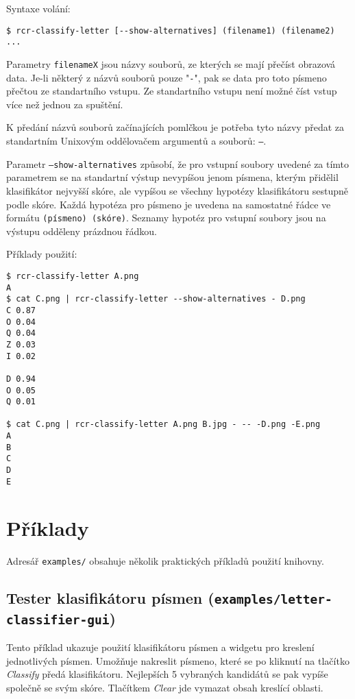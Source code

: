 \documentclass[a4paper]{article}
\begin{document}
Syntaxe volání:
\begin{lstlisting}
$ rcr-classify-letter [--show-alternatives] (filename1) (filename2) ...
\end{lstlisting}

Parametry \texttt{filenameX} jsou názvy souborů, ze kterých se mají přečíst
obrazová data. Je-li některý z názvů souborů pouze "\texttt{-}", pak se data
pro toto písmeno přečtou ze standartního vstupu. Ze standartního vstupu
není možné číst vstup více než jednou za spuštění.

K předání názvů souborů začínajících pomlčkou je potřeba tyto názvy předat
za standartním Unixovým oddělovačem argumentů a souborů: \texttt{--}.

Parametr \texttt{--show-alternatives} způsobí, že pro vstupní soubory
uvedené za tímto parametrem se na standartní výstup nevypíšou jenom
písmena, kterým přidělil klasifikátor nejvyšší skóre, ale vypíšou se
všechny hypotézy klasifikátoru sestupně podle skóre. Každá hypotéza
pro písmeno je uvedena na samostatné řádce ve formátu \texttt{(písmeno)
(skóre)}. Seznamy hypotéz pro vstupní soubory jsou na výstupu odděleny prázdnou
řádkou.

Příklady použití:
\begin{lstlisting}
$ rcr-classify-letter A.png
A
$ cat C.png | rcr-classify-letter --show-alternatives - D.png
C 0.87
O 0.04
Q 0.04
Z 0.03
I 0.02

D 0.94
O 0.05
Q 0.01

$ cat C.png | rcr-classify-letter A.png B.jpg - -- -D.png -E.png
A
B
C
D
E
\end{lstlisting}

\section{Příklady}
Adresář \texttt{examples/} obsahuje několik praktických příkladů použití knihovny.

\subsection{Tester klasifikátoru písmen (\texttt{examples/letter-classifier-gui})}
Tento příklad ukazuje použití klasifikátoru písmen a widgetu pro kreslení
jednotlivých písmen. Umožňuje nakreslit písmeno, které se po kliknutí na
tlačítko \textit{Classify} předá klasifikátoru. Nejlepších 5 vybraných kandidátů
se pak vypíše společně se svým skóre. Tlačítkem \textit{Clear} jde vymazat obsah
kreslící oblasti.
\end{document}
